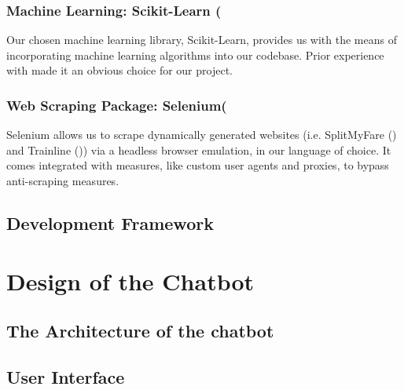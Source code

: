 \documentclass[11pt]{article}
\begin{document}
\subsubsection{Machine Learning: Scikit-Learn (\texorpdfstring{\cite{scikitlearn}})} \label{scikitlearn}
Our chosen machine learning library, Scikit-Learn, provides us with the means of incorporating machine learning algorithms into our codebase. Prior experience with made it an obvious choice for our project.

\subsubsection{Web Scraping Package: Selenium(\texorpdfstring{\cite{selenium}})} \label{selenium}
Selenium allows us to scrape dynamically generated websites (i.e. SplitMyFare (\cite {splitmyfare}) and Trainline (\cite{trainline})) via a headless browser emulation, in our language of choice. It comes integrated with measures, like custom user agents and proxies, to bypass anti-scraping measures.






 
\subsection{Development Framework} \label{development-framework}


\section{Design of the Chatbot} \label{design}

 
\subsection{The Architecture of the chatbot} \label{architecture}

\subsection{User Interface} \label{user-interface}
\end{document}
